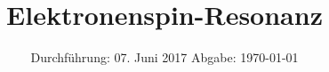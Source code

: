 
\subject{V28}
\title{Elektronenspin-Resonanz}
\date{
  Durchführung: 07. Juni 2017
  \hspace{3em}
  Abgabe: \today
}



\maketitle
\newpage
\mbox{}
\thispagestyle{empty}

\newpage
\newpage
\setcounter{page}{1}






\nocite{numpy}
\nocite{matplotlib}
\nocite{uncertainties}
\printbibliography


